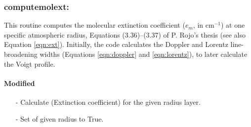 \documentclass[letterpaper,12pt]{article}
\begin{document}
\subsubsection{computemolext:}
This routine computes the molecular extinction coefficient ($e_m$, in
cm$^{-1}$) at one specific atmospheric radius, Equations
(3.36)--(3.37) of P. Rojo's thesis (see also Equation
\ref{eqn:ext}).  Initially, the code calculates the Doppler and
Lorentz line-broadening widths (Equations \ref{eqn:doppler} and
\ref{eqn:lorentz}), to later calculate the Voigt profile.

\paragraph{Modified}
\begin{enumerate}[leftmargin=10pt, noitemsep, parsep=0pt, topsep=0ex]
\item[-] Calculate  (Extinction coefficient) for the given radius layer.
\item[-] Set  of given radius to True.
\end{enumerate}
\end{document}
